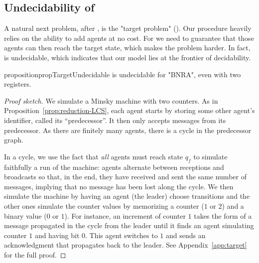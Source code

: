 \subsection{Undecidability of \TARGET}
\label{sec:undec-target}

A natural next problem, after \COVER, is the "target problem" (\TARGET).  
Our \COVER procedure heavily relies on the ability to add agents at no cost. For \TARGET we need to guarantee that those agents can then reach the target state, which makes the problem harder. 
In fact, \TARGET is undecidable, which indicates that our model lies at the frontier of decidability.

\begin{restatable}{proposition}{propTargetUndecidable}
\label{prop:target-undec}
\TARGET is undecidable for "BNRA", even with two registers.
\end{restatable}

\begin{proof}[Proof sketch]
We simulate a Minsky machine with two counters. As in Proposition~\ref{prop:reduction-LCS},  each agent starts by storing some other agent's identifier, called its ``predecessor''. It then only accepts messages from its predecessor. As there are finitely many agents, there is a cycle in the predecessor graph. 

In a cycle, we use the fact that \emph{all} agents must reach state $q_f$ to simulate faithfully a run of the machine: agents alternate between receptions and broadcasts so that, in the end, they have received and sent the same number of messages, implying that no message has been lost along the cycle.
We then simulate the machine by having an agent (the leader) choose transitions and the other ones simulate the counter values by memorizing a counter ($1$ or $2$) and a binary value ($0$ or $1$). For instance, an increment of counter $1$ takes the form of a message propagated in the cycle from the leader until it finds an agent simulating counter $1$ and having bit $0$. This agent switches to $1$ and sends an acknowledgment that propagates back to the leader. See Appendix~\ref{app:target} for the full proof. 
\end{proof}
